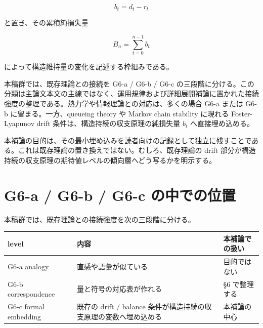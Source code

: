 \documentclass[12pt,a4paper]{article}
\begin{document}
\[
b_{t} = d_{t} - r_{t}
\]

と置き、その累積純損失量

\[
B_{n} = \sum_{t=0}^{n-1} b_{t}
\]

によって構造維持量の変化を記述する枠組みである。

本稿群では、既存理論との接続を G6-a / G6-b / G6-c の三段階に分ける。この分類は主論文本文の主線ではなく、運用規律および詳細展開補論に置かれた接続強度の整理である。熱力学や情報理論との対応は、多くの場合 G6-a または G6-b に留まる。一方、queueing theory や Markov chain stability に現れる Foster-Lyapunov drift 条件は、構造持続の収支原理の純損失量 \(b_{t}\) へ直接埋め込める。

本補論の目的は、その最小埋め込みを読者向けの記録として独立に残すことである。これは既存理論の置き換えではない。むしろ、既存理論の drift 部分が構造持続の収支原理の期待値レベルの傾向層へどう写るかを明示する。

\section{G6-a / G6-b / G6-c の中での位置}\label{g6-a-g6-b-g6-c-ux306eux4e2dux3067ux306eux4f4dux7f6e}

本稿群では、既存理論との接続強度を次の三段階に分ける。

{\def\LTcaptype{table} %
\begin{longtable}[]{@{}
  >{\raggedright\arraybackslash}p{}
  >{\raggedright\arraybackslash}p{}
  >{\raggedright\arraybackslash}p{}@{}}
\toprule\noalign{}
\begin{minipage}[b]{\linewidth}\raggedright
level
\end{minipage} & \begin{minipage}[b]{\linewidth}\raggedright
内容
\end{minipage} & \begin{minipage}[b]{\linewidth}\raggedright
本補論での扱い
\end{minipage} \\
\midrule\noalign{}
\endhead
\bottomrule\noalign{}
\endlastfoot
G6-a analogy & 直感や語彙が似ている & 目的ではない \\
G6-b correspondence & 量と符号の対応表が作れる & §6 で整理する \\
G6-c formal embedding & 既存の drift / balance 条件が構造持続の収支原理の変数へ埋め込める & 本補論の中心 \\
\end{longtable}
}
\end{document}
